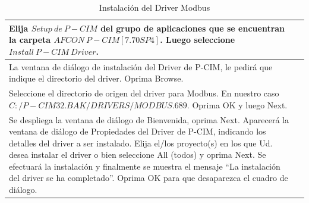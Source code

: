 \begin{table}[H]
\centering
\renewcommand*{\arraystretch}{0.3}
\begin{tabular}{*{2}{m{}}}
\hline
  Elija $Setup~de~P-CIM$ del grupo de aplicaciones que se encuentran la carpeta 
  $AFCON~P-CIM[7.70SP4]$. Luego seleccione $Install~P-CIM~Driver$.
  &\begin{center}
    \rule{0.4\textwidth}{0.3\textwidth}
  \end{center}\\
\hline
  La ventana de diálogo de instalación del Driver de P-CIM, le pedirá que 
  indique el directorio del driver.
       Oprima Browse.
  &\begin{center}
    \rule{0.4\textwidth}{0.3\textwidth}
  \end{center}\\
\hline
  Seleccione el directorio de origen del driver para Modbus. En nuestro caso 
  $C:/P-CIM32.BAK/DRIVERS/MODBUS.689$. Oprima OK y luego Next.
  &\begin{center}
    \rule{0.4\textwidth}{0.3\textwidth}
  \end{center}\\
\hline
 Se despliega la ventana de diálogo de Bienvenida, oprima Next. 
 Aparecerá la ventana de diálogo de Propiedades del Driver de 
 P-CIM, indicando los detalles del driver a ser instalado.
 Elija el/los proyecto(s) en los que Ud. desea instalar el driver o bien 
 seleccione All (todos) y oprima Next.
 Se efectuará la instalación y finalmente se muestra el mensaje “La instalación 
 del driver se ha completado”. Oprima OK para que desaparezca el cuadro de 
 diálogo.
  &\begin{center}
    \rule{0.4\textwidth}{0.3\textwidth}
  \end{center}\\
\hline
\end{tabular}
\label{tab:installModbus}
\caption{Instalación del Driver Modbus}
\end{table}


